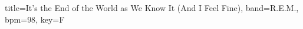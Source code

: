 \documentclass{skrul-leadsheet-chords}[20pt]
\begin{document}
\begin{song}[transpose-capo=true]{title={It's the End of the World as We Know It (And I Feel Fine)}, band={R.E.M.}, bpm={98}, key={F}}
\begin{c4}
\end{c4}

\begin{c5}
\end{c5}

\begin{c6}
\end{c6}

\begin{out}
\end{out}

\end{song}
\end{document}
